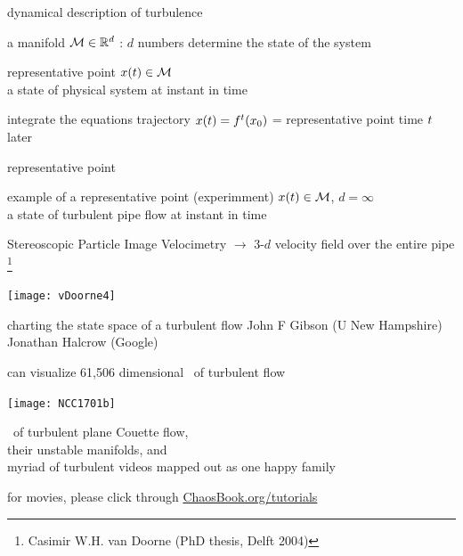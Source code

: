 \begin{frame}{dynamical description of turbulence}

\begin{block}{\statesp}
a manifold $\mathcal{M} \in \mathbb{R}^{d}$ :
$d$ numbers determine the state of the system
\end{block}

\bigskip

\begin{block}{representative point }
$x(t) \in \mathcal{M}$
\\
a state of physical system at instant in time
\end{block}

\bigskip

\begin{block}{integrate the equations}
trajectory $x(t) = {f^{t}({x_0})}$ =
representative point time $t$ later
\end{block}
\end{frame}

\begin{frame}{representative point}
\begin{block}{example of a representative point (experimment)}
$x(t) \in \mathcal{M}$, $d= \infty$ \\
a state of turbulent pipe flow at instant in time
\end{block}

\bigskip

Stereoscopic Particle Image Velocimetry $\to$
3-$d$ velocity field over the entire pipe%
\footnote{\footnotesize
Casimir W.H. van Doorne
(PhD thesis, Delft  2004)
}

\bigskip

\begin{center}
\texttt{[image: vDoorne4]}
\end{center}
\end{frame}

\begin{frame}{charting the state space of a turbulent flow}
John F Gibson (U New Hampshire)
\\
Jonathan Halcrow (Google)
\end{frame}

\begin{frame}{can visualize 61,506 dimensional \statesp\ of turbulent flow}
\begin{center}
\texttt{[image: NCC1701b]}
\end{center}
\eqva\ of turbulent plane Couette flow,
\\
their unstable manifolds, and
\\
myriad of turbulent videos mapped out as one happy family

\bigskip

\hfill   {\small
          for movies, please click through
            \textcolor{blue}{\href{http://ChaosBook.org/tutorials}
             {ChaosBook.org/tutorials}}
          }
\end{frame}


